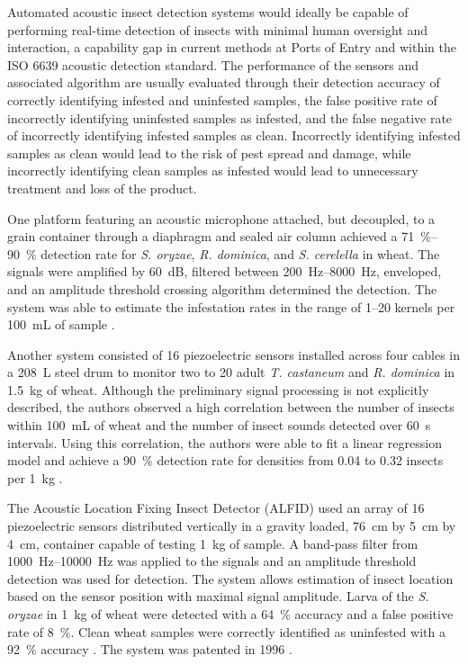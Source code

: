 \documentclass[../Vibro-Acoustic Signatures and Detection Algorithms for Stored Product Insects.tex]{subfiles}
\begin{document}
Automated acoustic insect detection systems would ideally be capable of performing real-time detection of insects with minimal human oversight and interaction, a capability gap in current methods at Ports of Entry and within the ISO 6639 acoustic detection standard. The performance of the sensors and associated algorithm are usually evaluated through their detection accuracy of correctly identifying infested and uninfested samples, the false positive rate of incorrectly identifying uninfested samples as infested, and the false negative rate of incorrectly identifying infested samples as clean. Incorrectly identifying infested samples as clean would lead to the risk of pest spread and damage, while incorrectly identifying clean samples as infested would lead to unnecessary treatment and loss of the product.

One platform featuring an acoustic microphone attached, but decoupled, to a grain container through a diaphragm and sealed air column achieved a \SIrange{71}{90}{\percent} detection rate for \textit{S. oryzae}, \textit{R. dominica}, and \textit{S. cerelella} in wheat. The signals were amplified by \SI{60}{\deci\bel}, filtered between \SIrange{200}{8000}{\hertz}, enveloped, and an amplitude threshold crossing algorithm determined the detection. The system was able to estimate the infestation rates in the range of \numrange{1}{20} kernels per \SI{100}{\milli\liter} of sample \cite{vickSoundDetectionStoredProduct1988, webbAcousticalSystemDetect1988}.

\newpage
Another system consisted of 16 piezoelectric sensors installed across four cables in a \SI{208}{\liter} steel drum to monitor two to 20 adult \textit{T. castaneum} and \textit{R. dominica} in \SI{1.5}{\kilo\gram} of wheat. Although the preliminary signal processing is not explicitly described, the authors observed a high correlation between the number of insects within \SI{100}{\milli\liter} of wheat and the number of insect sounds detected over \SI{60}{\second} intervals. Using this correlation, the authors were able to fit a linear regression model and achieve a \SI{90}{\percent} detection rate for densities from 0.04 to 0.32 insects per \SI{1}{\kilo\gram} \cite{hagstrumAcousticalMonitoringRhyzopertha1990}.

The Acoustic Location Fixing Insect Detector (ALFID) used an array of 16 piezoelectric sensors distributed vertically in a gravity loaded, \SI{76}{\centi\meter} by \SI{5}{\centi\meter} by \SI{4}{\centi\meter}, container capable of testing \SI{1}{\kilo\gram} of sample. A band-pass filter from \SIrange{1000}{10000}{\hertz} was applied to the signals and an amplitude threshold detection was used for detection. The system allows estimation of insect location based on the sensor position with maximal signal amplitude. Larva of the \textit{S. oryzae} in \SI{1}{\kilo\gram} of wheat were detected with a \SI{64}{\percent} accuracy and a false positive rate of \SI{8}{\percent}. Clean wheat samples were correctly identified as uninfested with a \SI{92}{\percent} accuracy \cite{shumanQuantitativeAcousticalDetection1993,mankinAcousticCountingAdult1997}. The system was patented in 1996 \cite{vickAcousticLocationFixing1996}.
\end{document}
